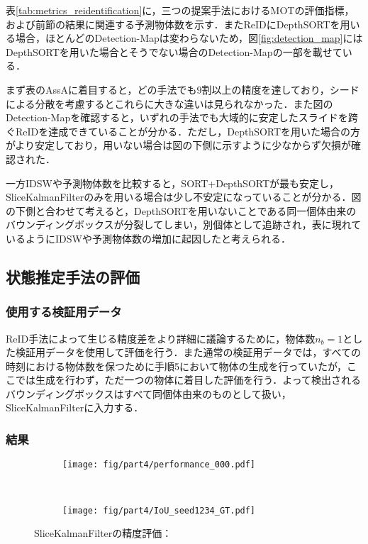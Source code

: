         表\ref{tab:metrics_reidentification}に，三つの提案手法におけるMOTの評価指標，および前節の結果に関連する予測物体数を示す．またReIDにDepthSORTを用いる場合，ほとんどのDetection-Mapは変わらないため，図\ref{fig:detection_map}にはDepthSORTを用いた場合とそうでない場合のDetection-Mapの一部を載せている．

        まず表のAssAに着目すると，どの手法でも$9$割以上の精度を達しており，シードによる分散を考慮するとこれらに大きな違いは見られなかった．また図のDetection-Mapを確認すると，いずれの手法でも大域的に安定したスライドを跨ぐReIDを達成できていることが分かる．ただし，DepthSORTを用いた場合の方がより安定しており，用いない場合は図の下側に示すように少なからず欠損が確認された．

        一方IDSWや予測物体数を比較すると，SORT+DepthSORTが最も安定し，SliceKalmanFilterのみを用いる場合は少し不安定になっていることが分かる．図の下側と合わせて考えると，DepthSORTを用いないことである同一個体由来のバウンディングボックスが分裂してしまい，別個体として追跡され，表に現れているようにIDSWや予測物体数の増加に起因したと考えられる．


    \subsection{状態推定手法の評価}
    \label{subsec:estimation_evaluation}

    


        \subsubsection{使用する検証用データ}

        ReID手法によって生じる精度差をより詳細に議論するために，物体数$n_b = 1$とした検証用データを使用して評価を行う．また通常の検証用データでは，すべての時刻における物体数を保つために手順5において物体の生成を行っていたが，ここでは生成を行わず，ただ一つの物体に着目した評価を行う．よって検出されるバウンディングボックスはすべて同個体由来のものとして扱い，SliceKalmanFilterに入力する．

        \subsubsection{結果}

        \begin{figure}[t]
            \begin{subfigure}[t]{\linewidth}
                \centering
                \texttt{[image: fig/part4/performance\_000.pdf]}
            \end{subfigure}
            \\
            \begin{subfigure}[t]{\linewidth}
                \centering
                \texttt{[image: fig/part4/IoU\_seed1234\_GT.pdf]}
            \end{subfigure}
            \caption[SliceKalmanFilterの精度評価]{SliceKalmanFilterの精度評価：}
            \label{fig:SKF_evaluation}
        \end{figure}


